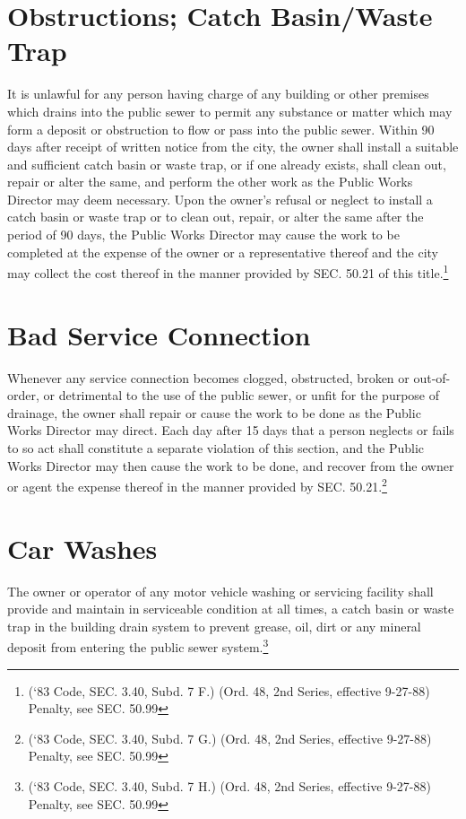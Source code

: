 \section{Obstructions; Catch Basin/Waste Trap}
It is unlawful for any person having charge of any building or other premises which drains into the public sewer to permit any substance or matter which may form a deposit or obstruction to flow or pass into the public sewer.  Within 90 days after receipt of written notice from the city, the owner shall install a suitable and sufficient catch basin or waste trap, or if one already exists, shall clean out, repair or alter the same, and perform the other work as the Public Works Director may deem necessary.  Upon the owner’s refusal or neglect to install a catch basin or waste trap or to clean out, repair, or alter the same after the period of 90 days, the Public Works Director may cause the work to be completed at the expense of the owner or a representative thereof and the city may collect the cost thereof in the manner provided by SEC. 50.21 of this title.\footnote{(‘83 Code, SEC. 3.40, Subd. 7 F.) (Ord. 48, 2nd Series, effective 9-27-88) Penalty, see SEC. 50.99}

\section{Bad Service Connection}
Whenever any service connection becomes clogged, obstructed, broken or out-of-order, or detrimental to the use of the public sewer, or unfit for the purpose of drainage, the owner shall repair or cause the work to be done as the Public Works Director may direct.  Each day after 15 days that a person neglects or fails to so act shall constitute a separate violation of this section, and the Public Works Director may then cause the work to be done, and recover from the owner or agent the expense thereof in the manner provided by SEC. 50.21.\footnote{(‘83 Code, SEC. 3.40, Subd. 7 G.) (Ord. 48, 2nd Series, effective 9-27-88) Penalty, see SEC. 50.99}

\section{Car Washes}
The owner or operator of any motor vehicle washing or servicing facility shall provide and maintain in serviceable condition at all times, a catch basin or waste trap in the building drain system to prevent grease, oil, dirt or any mineral deposit from entering the public sewer system.\footnote{(‘83 Code, SEC. 3.40, Subd. 7 H.) (Ord. 48, 2nd Series, effective 9-27-88) Penalty, see SEC. 50.99}


